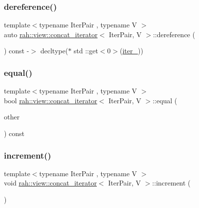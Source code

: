 \subsubsection{\texorpdfstring{dereference()}{dereference()}}
{\footnotesize\ttfamily template$<$typename Iter\+Pair , typename V $>$ \\
auto \mbox{\hyperlink{structrah_1_1view_1_1concat__iterator}{rah\+::view\+::concat\+\_\+iterator}}$<$ Iter\+Pair, V $>$\+::dereference (\begin{DoxyParamCaption}{ }\end{DoxyParamCaption}) const -\/$>$ decltype($\ast$ std \+::get$<$0$>$(\mbox{\hyperlink{structrah_1_1view_1_1concat__iterator_affb17b45b66a04b01962c8b84dc20c43}{iter\+\_\+}}))
	\hspace{0.3cm}{\ttfamily [inline]}}

\mbox{\label{structrah_1_1view_1_1concat__iterator_a6e8021ecde205f2ceba2c167a6954d05}} 
\subsubsection{\texorpdfstring{equal()}{equal()}}
{\footnotesize\ttfamily template$<$typename Iter\+Pair , typename V $>$ \\
bool \mbox{\hyperlink{structrah_1_1view_1_1concat__iterator}{rah\+::view\+::concat\+\_\+iterator}}$<$ Iter\+Pair, V $>$\+::equal (\begin{DoxyParamCaption}\item[{\mbox{\hyperlink{structrah_1_1view_1_1concat__iterator}{concat\+\_\+iterator}}$<$ Iter\+Pair, V $>$}]{other }\end{DoxyParamCaption}) const\hspace{0.3cm}{\ttfamily [inline]}}

\mbox{\label{structrah_1_1view_1_1concat__iterator_a6301909457da06a9894f4681353442b4}} 
\subsubsection{\texorpdfstring{increment()}{increment()}}
{\footnotesize\ttfamily template$<$typename Iter\+Pair , typename V $>$ \\
void \mbox{\hyperlink{structrah_1_1view_1_1concat__iterator}{rah\+::view\+::concat\+\_\+iterator}}$<$ Iter\+Pair, V $>$\+::increment (\begin{DoxyParamCaption}{ }\end{DoxyParamCaption})\hspace{0.3cm}{\ttfamily [inline]}}



